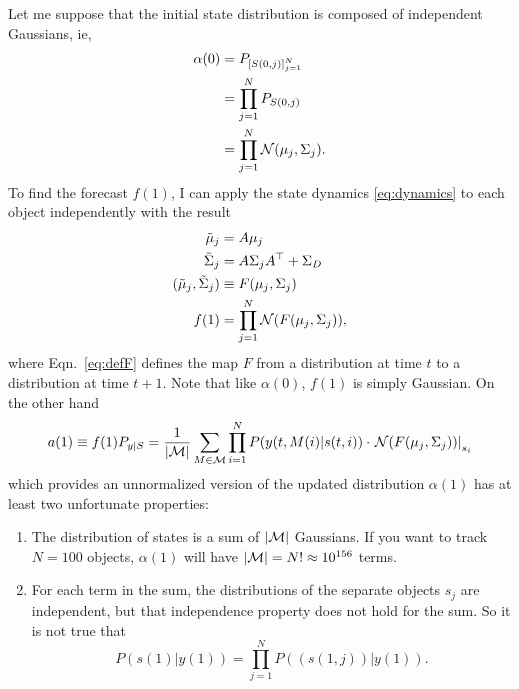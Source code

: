 \documentclass[12pt]{article}
\newcommand{\normal}[2]{{\cal N}(#1,#2)}
\newcommand{\M}{{\cal M}}
\newcommand{\transpose}{^\top}
\newcommand{\os}[4]{{\left[ #1(#2) \right]}_{#3}^{#4}} %
\newcommand{\ti}[2]{{#1}{(#2)}}                         %
\begin{document}
Let me suppose that the initial state distribution is composed of
independent Gaussians, ie,
\begin{align*}
  \ti{\alpha}{0} &= P_{\os{S}{0,j}{j=1}{N} }\\
  &= \prod_{j=1}^{N} P_{\ti{S}{0,j}} \\
  &= \prod_{j=1}^{N} \normal{\mu_j}{\Sigma_j}.
\end{align*}
To find the forecast $\ti{f}{1}$, I can apply the state dynamics
\eqref{eq:dynamics} to each object independently with the result
\begin{align}
  \tilde \mu_j &= A \mu_j \\
  \tilde \Sigma_j &= A \Sigma_j A\transpose + \Sigma_D \\
  \label{eq:defF}
  (\tilde \mu_j, \tilde \Sigma_j ) &\equiv F(\mu_j,\Sigma_j) \\
  \label{eq:f1}
  \ti{f}{1} &= \prod_{j=1}^{N} {\cal N}(F(\mu_j,\Sigma_j)),
\end{align}
where Eqn.~\eqref{eq:defF} defines the map $F$ from a distribution at
time $t$ to a distribution at time $t+1$.  Note that like
$\ti{\alpha}{0}$, $\ti{f}{1}$ is simply Gaussian.  On the other hand
\begin{equation}
  \label{eq:a1}
  a(1) \equiv f(1) P_{y|S} = \frac{1}{\left| \M \right|} \sum_{M \in \M}
  \prod_{i=1}^N P(y(t,M(i)|s(t,i)) \cdot \left. {\cal
      N}(F(\mu_j,\Sigma_j))\right|_{s_i}
\end{equation}
which provides an unnormalized version of the updated distribution
$\alpha(1)$ has at least two unfortunate properties:
\begin{enumerate}
\item The distribution of states is a sum of $\left| \M \right|$
  Gaussians.  If you want to track $N=100$ objects, $\alpha(1)$ will
  have $\left| \M \right| = N! \approx 10^{156}$ terms.
\item For each term in the sum, the distributions of the separate
  objects $s_j$ are independent, but that independence property does
  not hold for the sum.  So it is not true that
  \begin{equation*}
    P(s(1)|y(1)) = \prod_{j=1}^N  P\left( \left( s(1,j) \right)|y(1)
    \right).
  \end{equation*}
\end{enumerate}
\end{document}
